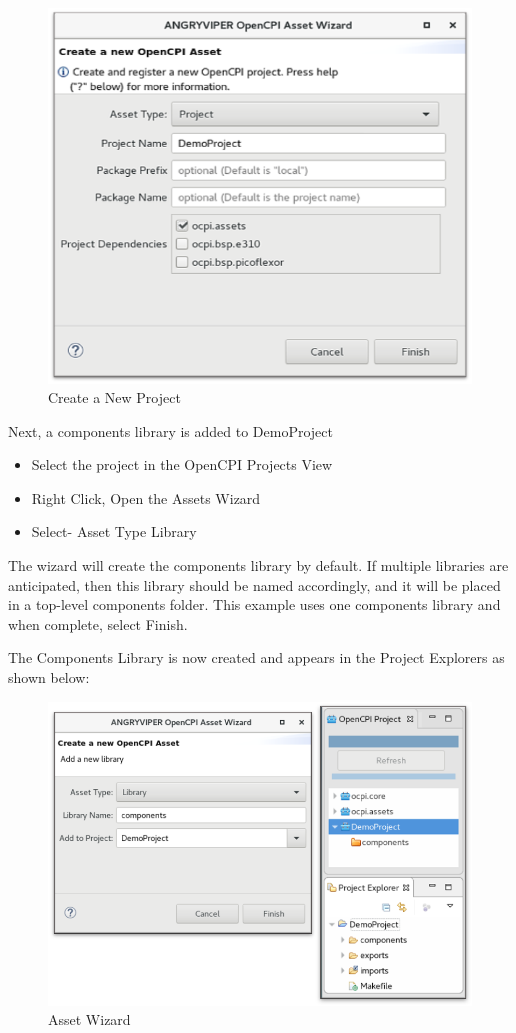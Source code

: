 \documentclass[10pt, a4paper, oneside]{article}
\begin{document}
\begin{figure}[h!]
	\centering
	\caption{Create a New Project}\label{fig:CreateaNewProject}
	\includegraphics[width=.75\textwidth]{CreateaNewProject.png}
 \end{figure}

Next, a components library is added to DemoProject
\begin{itemize}
\item	Select the project in the OpenCPI Projects View
\item	Right Click, Open the Assets Wizard
\item	Select- Asset Type Library
\end{itemize}
The wizard will create the components library by default. If multiple libraries are anticipated, then this library should be named accordingly, and it will be placed in a top-level components folder. This example uses one components library and when complete, select Finish.

The Components Library is now created and appears in the Project Explorers as shown below:

\begin{figure}[h!]
	\centering
	\caption{Asset Wizard}\label{fig:AssetWizard2}
	\includegraphics[width=.90\textwidth]{AssetWizard2.png}
 \end{figure}
\end{document}
